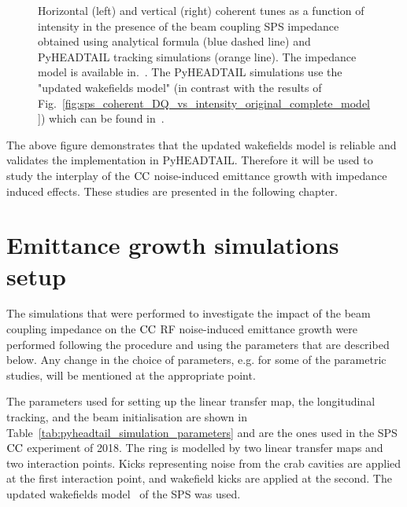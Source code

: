 \begin{figure}[!ht]
\begin{subfigure}[t]{0.45\textwidth}
    \end{subfigure}
    \hfill
     \caption{Horizontal (left) and vertical (right) coherent tunes as a function of intensity in the presence of the beam coupling SPS impedance obtained using analytical formula (blue dashed line) and PyHEADTAIL tracking simulations (orange line). The impedance model is available in.~\cite{sps_impedance_model_git}. The PyHEADTAIL simulations use the "updated wakefields model" (in contrast with the results of Fig.~\ref{fig:sps_coherent_DQ_vs_intensity_original_complete_model}) which can be found in~\cite{updated_sps_wakfields_model}.}
     \label{fig:sps_coherent_DQ_vs_intensity_updated_model}
 \end{figure}

 The above figure demonstrates that the updated wakefields model is reliable and validates the implementation in PyHEADTAIL. Therefore it will be used to study the interplay of the ${\mathrm{CC}}$ noise-induced emittance growth with impedance induced effects. These studies are presented in the following chapter.


\section{Emittance growth simulations setup}\label{sec:setup_simulations_emit_growth}
The simulations that were performed to investigate the impact of the beam coupling impedance on the ${\mathrm{CC}}$ RF noise-induced emittance growth were performed following the procedure and using the parameters that are described below. Any change in the choice of parameters, e.g. for some of the parametric studies, will be mentioned at the appropriate point.

The parameters used for setting up the linear transfer map, the longitudinal tracking, and the beam initialisation are shown in Table~\ref{tab:pyheadtail_simulation_parameters} and are the ones used in the SPS ${\mathrm{CC}}$ experiment of 2018. The ring is modelled by two linear transfer maps and two interaction points. Kicks representing noise from the crab cavities are applied at the first interaction point, and wakefield kicks are applied at the second. The updated wakefields model~\cite{updated_sps_wakfields_model} of the SPS was used.

